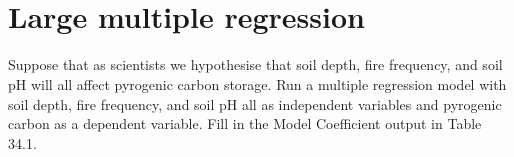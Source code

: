 \documentclass[
  openany]{krantz}
\begin{document}
\begin{verbatim}



\end{verbatim}

\hypertarget{large-multiple-regression}{%
\section{Large multiple regression}\label{large-multiple-regression}}

Suppose that as scientists we hypothesise that soil depth, fire frequency, and soil pH will all affect pyrogenic carbon storage.
Run a multiple regression model with soil depth, fire frequency, and soil pH all as independent variables and pyrogenic carbon as a dependent variable.
Fill in the Model Coefficient output in Table 34.1.
\end{document}
